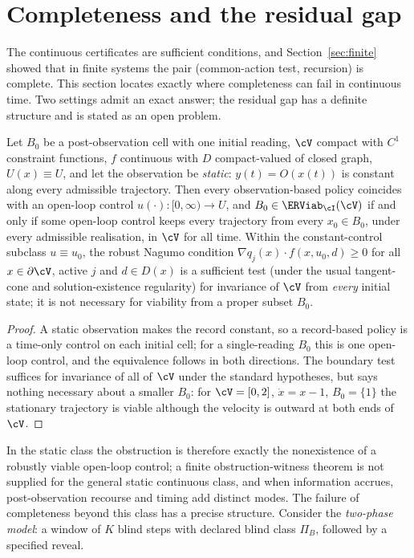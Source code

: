 \section{Completeness and the residual gap}\label{sec:completeness}

The continuous certificates are sufficient conditions, and Section~\ref{sec:finite} showed that in finite systems the pair (common-action test, recursion) is complete. This section locates exactly where completeness can fail in continuous time. Two settings admit an exact answer; the residual gap has a definite structure and is stated as an open problem.

\begin{theorem}\label{thm:static}
Let $B_0$ be a post-observation cell with one initial reading, $\cV$ compact with $C^1$ constraint functions, $f$ continuous with $D$ compact-valued of closed graph, $U(x)\equiv U$, and let the observation be \emph{static}: $y(t)=O(x(t))$ is constant along every admissible trajectory. Then every observation-based policy coincides with an open-loop control $u(\cdot):[0,\infty)\to U$, and $B_0\in\ERViab_\cI(\cV)$ if and only if some open-loop control keeps every trajectory from every $x_0\in B_0$, under every admissible realisation, in $\cV$ for all time. Within the constant-control subclass $u\equiv u_0$, the robust Nagumo condition \citep{nagumo1942} $\nabla q_j(x)\cdot f(x,u_0,d)\ge0$ for all $x\in\partial\cV$, active $j$ and $d\in D(x)$ is a sufficient test (under the usual tangent-cone and solution-existence regularity) for invariance of $\cV$ from \emph{every} initial state; it is not necessary for viability from a proper subset $B_0$.
\end{theorem}

\begin{proof}
A static observation makes the record constant, so a record-based policy is a time-only control on each initial cell; for a single-reading $B_0$ this is one open-loop control, and the equivalence follows in both directions. The boundary test suffices for invariance of all of $\cV$ under the standard hypotheses, but says nothing necessary about a smaller $B_0$: for $\cV=[0,2]$, $\dot x=x-1$, $B_0=\{1\}$ the stationary trajectory is viable although the velocity is outward at both ends of $\cV$.
\end{proof}

In the static class the obstruction is therefore exactly the nonexistence of a robustly viable open-loop control; a finite obstruction-witness theorem is not supplied for the general static continuous class, and when information accrues, post-observation recourse and timing add distinct modes. The failure of completeness beyond this class has a precise structure. Consider the \emph{two-phase model}: a window of $K$ blind steps with declared blind class $\Pi_B$, followed by a specified reveal.

